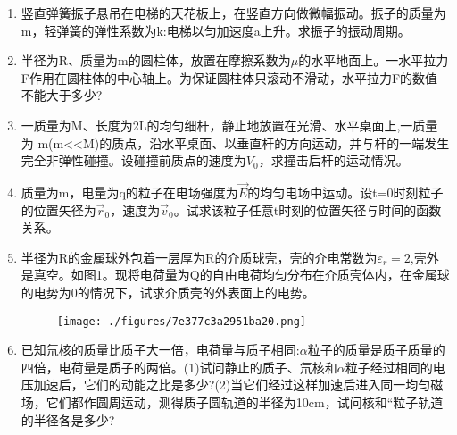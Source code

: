 
\begin{enumerate}
\item 竖直弹簧振子悬吊在电梯的天花板上，在竖直方向做微幅振动。振子的质量为m，轻弹簧的弹性系数为k:电梯以匀加速度a上升。求振子的振动周期。
\item 半径为R、质量为m的圆柱体，放置在摩擦系数为$\mu$的水平地面上。一水平拉力F作用在圆柱体的中心轴上。为保证圆柱体只滚动不滑动，水平拉力F的数值不能大于多少?
\item 一质量为M、长度为2L的均匀细杆，静止地放置在光滑、水平桌面上,一质量为 m(m<<M)的质点，沿水平桌面、以垂直杆的方向运动，并与杆的一端发生完全非弹性碰撞。设碰撞前质点的速度为$V_0$，求撞击后杆的运动情况。
\item 质量为m，电量为q的粒子在电场强度为$\vec E$的均匀电场中运动。设t=0时刻粒子的位置矢径为$\vec r_0$，速度为$\vec v_0$。试求该粒子任意t时刻的位置矢径与时间的函数关系。
\item 半径为R的金属球外包着一层厚为R的介质球壳，壳的介电常数为$\varepsilon_r=2$,壳外是真空。如图1。现将电荷量为Q的自由电荷均匀分布在介质壳体内，在金属球的电势为0的情况下，试求介质壳的外表面上的电势。
\begin{figure}[ht]
\centering
\texttt{[image: ./figures/7e377c3a2951ba20.png]}
\caption{} \label{fig_SSD04_1}
\end{figure}
\item 已知氘核的质量比质子大一倍，电荷量与质子相同:$\alpha$粒子的质量是质子质量的四倍，电荷量是质子的两倍。(1)试问静止的质子、氘核和$\alpha$粒子经过相同的电压加速后，它们的动能之比是多少?(2)当它们经过这样加速后进入同一均匀磁场，它们都作圆周运动，测得质子圆轨道的半径为10cm，试问核和“粒子轨道的半径各是多少?
\end{enumerate}